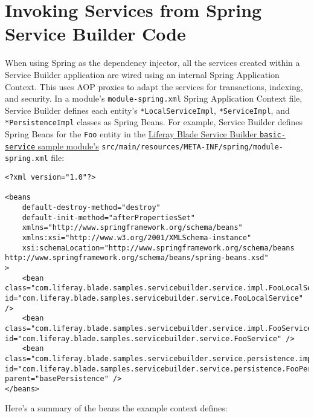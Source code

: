\chapter{Invoking Services from Spring Service Builder
Code}\label{invoking-services-from-spring-service-builder-code}

When using Spring as the dependency injector, all the services created
within a Service Builder application are wired using an internal Spring
Application Context. This uses AOP proxies to adapt the services for
transactions, indexing, and security. In a module's
\texttt{module-spring.xml} Spring Application Context file, Service
Builder defines each entity's \texttt{*LocalServiceImpl},
\texttt{*ServiceImpl}, and \texttt{*PersistenceImpl} classes as Spring
Beans. For example, Service Builder defines Spring Beans for the
\texttt{Foo} entity in the
\href{/docs/7-2/reference/-/knowledge_base/r/service-builder-samples}{Liferay
Blade Service Builder \texttt{basic-service} sample module's}
\texttt{src/main/resources/META-INF/spring/module-spring.xml} file:

\begin{verbatim}
<?xml version="1.0"?>

<beans
    default-destroy-method="destroy"
    default-init-method="afterPropertiesSet"
    xmlns="http://www.springframework.org/schema/beans"
    xmlns:xsi="http://www.w3.org/2001/XMLSchema-instance"
    xsi:schemaLocation="http://www.springframework.org/schema/beans http://www.springframework.org/schema/beans/spring-beans.xsd"
>
    <bean class="com.liferay.blade.samples.servicebuilder.service.impl.FooLocalServiceImpl" id="com.liferay.blade.samples.servicebuilder.service.FooLocalService" />
    <bean class="com.liferay.blade.samples.servicebuilder.service.impl.FooServiceImpl" id="com.liferay.blade.samples.servicebuilder.service.FooService" />
    <bean class="com.liferay.blade.samples.servicebuilder.service.persistence.impl.FooPersistenceImpl" id="com.liferay.blade.samples.servicebuilder.service.persistence.FooPersistence" parent="basePersistence" />
</beans>
\end{verbatim}

Here's a summary of the beans the example context defines:


